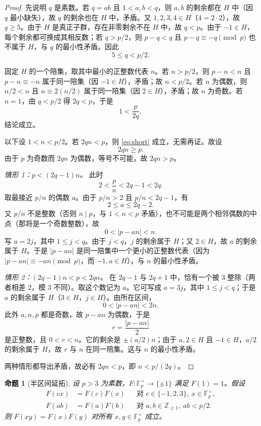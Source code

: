 \documentclass[11pt,a4paper]{ctexart}
\theoremstyle{plain}
\newtheorem{proposition}[theorem]{命题}
\theoremstyle{definition}
\newcommand{\Fpx}{\mathbb{F}_p^{\times}}
\newcommand{\Z}{\mathbb{Z}}
\begin{document}
\begin{proof}
先说明 $q$ 是素数。若 $q=ab$ 且 $1<a,b<q$，则 $a,b$ 的剩余都在 $H$ 中（因 $q$ 最小缺失），故 $q$ 的剩余也在 $H$ 中，矛盾。又 $1,2,3,4\in H$（$4=2\cdot2$），故 $q\ge5$。由于 $H$ 是真正子群，存在非零剩余不在 $H$ 中，故 $q<p$。由于 $-1\in H$，每个剩余都可换成其相反数；若 $q>p/2$，则 $p-q<q$ 且 $p-q\equiv-q\pmod p$ 也不属于 $H$，与 $q$ 的最小性矛盾。因此
\[
  5\le q<p/2.
\]

固定 $H$ 的一个陪集，取其中最小的正整数代表 $n$。若 $n>p/2$，则 $p-n<n$ 且 $p-n\equiv -n$ 属于同一陪集（因 $-1\in H$），矛盾；故 $n<p/2$。若 $n$ 为偶数，则 $n/2<n$ 且 $n\equiv2(n/2)$ 属于同一陪集（因 $2\in H$），矛盾；故 $n$ 为奇数。若 $n=1$，由 $q<p/2$ 得 $2q<p$，于是
\[
  1<\frac{p}{2q},
\]
结论成立。

以下设 $1<n<p/2$。若 $2qn<p$，则 \eqref{eq:short} 成立，无需再证。故设
\begin{equation}
  2qn\ge p.
  \label{eq:large}
\end{equation}
由于 $p$ 为奇数而 $2qn$ 为偶数，等号不可能，故 $2qn>p$。

\smallskip
\noindent\textit{情形 1：$p<(2q-1)n$。}
此时
\[
  2<\frac{p}{n}<2q-1<2q.
\]
取最接近 $p/n$ 的偶数 $a$。由于 $p/n>2$ 且 $p/n<2q-1$，有
\[
  2\le a\le2q-2.
\]
又 $p/n$ 不是整数（否则 $n\mid p$，与 $1<n<p$ 矛盾），也不可能是两个相邻偶数的中点（那将是一个奇数整数），故
\[
  0<|p-an|<n.
\]
写 $a=2j$，其中 $1\le j<q$。由于 $j<q$，$j$ 的剩余属于 $H$；又 $2\in H$，故 $a$ 的剩余属于 $H$。于是 $|p-an|$ 是同一陪集中一个更小的正整数代表（因为 $|p-an|\equiv -an\pmod p$，而 $-1,a\in H$），与 $n$ 的最小性矛盾。

\smallskip
\noindent\textit{情形 2：$(2q-1)n<p<2qn$。}
在 $2q-1$ 与 $2q+1$ 中，恰有一个被 $3$ 整除（两者相差 $2$，模 $3$ 不同）。取这个数记为 $a$。它可写成 $a=3j$，其中 $1\le j<q$；于是 $a$ 的剩余属于 $H$（$3\in H$，$j\in H$）。由所在区间，
\[
  0<|p-an|<2n.
\]
此外 $a,n,p$ 都是奇数，故 $p-an$ 为偶数，于是
\[
  r=\frac{|p-an|}{2}
\]
是正整数，且 $0<r<n$。它的剩余是 $\pm(a/2)n$；由于 $a,2\in H$ 且 $-1\in H$，$a/2$ 的剩余属于 $H$，故 $r$ 与 $n$ 在同一陪集。这与 $n$ 的最小性矛盾。

两种情形都导出矛盾，故必有 $2qn<p$，即 $n<p/(2q)$。
\end{proof}

\begin{proposition}[半区间延拓]
\label{prop:extension}
设 $p>3$ 为素数，$F:\Fpx\to\{\pm1\}$ 满足 $F(1)=1$。假设
\begin{align}
  F(cx)&=F(c)F(x)&&\text{对 }c\in\{-1,2,3\},\ x\in\Fpx,
  \label{eq:small-exact}\\
  F(ab)&=F(a)F(b)&&\text{对 }a,b\in\Z_{\ge1},\ ab<p/2.
  \label{eq:short-mult}
\end{align}
则 $F(xy)=F(x)F(y)$ 对所有 $x,y\in\Fpx$ 成立。
\end{proposition}
\end{document}
